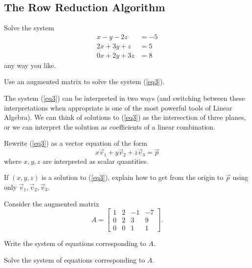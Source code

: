 \documentclass{article}
\begin{document}
\subsection*{The Row Reduction Algorithm}

	\begin{Enum}
		\item Solve the system
		\begin{equation}\label{eq3}
			\begin{array}{ll}
				x-y-2z &= -5\\
				2x+3y+z &= 5\\
				0x+2y+3z &= 8
			\end{array}
		\end{equation}
		any way you like.

		\item Use an augmented matrix to solve the system (\ref{eq3}).
	\end{Enum}

	The system (\ref{eq3}) can be interpreted in two ways (and switching between these 
	interpretations when appropriate is one of the most powerful tools of Linear 
	Algebra).  We can think of solutions to (\ref{eq3})
	as the intersection of three planes, or we can interpret the solution
	as coefficients of a linear combination.

	\begin{Enum}[resume]
		\item Rewrite (\ref{eq3}) as a vector equation of the form
		\[
			x\vec v_1+y\vec v_2+z\vec v_3 = \vec p
		\]
		where $x,y,z$ are interpreted as scalar quantities.

		\item If $(x,y,z)$ is a solution to (\ref{eq3}), explain how to get from the
		origin to $\vec p$ using only $\vec v_1, \vec v_2, \vec v_3$.
	\end{Enum}

	Consider the augmented matrix
	\[
		A=\left[\begin{array}{ccc|c}
			1 & 2 & -1 & -7\\
			0 & 2 & 3 & 9\\
			0 & 0 & 1 & 1
		\end{array}\right].
	\]
	\begin{Enum}
		\item Write the system of equations corresponding to $A$.
		\item Solve the system of equations corresponding to $A$.
	\end{Enum}
\end{document}
